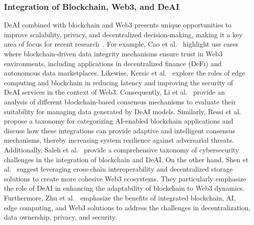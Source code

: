 \documentclass[5p,twocolumn]{elsarticle}
\begin{document}
\subsubsection{Integration of Blockchain, Web3, and DeAI}
DeAI combined with blockchain and Web3 presents unique opportunities to improve scalability, privacy, and decentralized decision-making, making it a key area of focus for recent research~\cite{cao2022decentralized,kersic2024review,li2024blockchain,ressi2024ai,saleh2024blockchain,shen2024artificial,zhu2024survey}. For example, Cao et al.~\cite{cao2022decentralized} highlight use cases where blockchain-driven data integrity mechanisms ensure trust in Web3 environments, including applications in decentralized finance (DeFi) and autonomous data marketplaces. Likewise, Kersic et al.~\cite{kersic2024review} explore the roles of edge computing and blockchain in reducing latency and improving the security of DeAI services in the context of Web3. Consequently, Li et al.~\cite{li2024blockchain} provide an analysis of different blockchain-based consensus mechanisms to evaluate their suitability for managing data generated by DeAI models. Similarly, Ressi et al.~\cite{ressi2024ai} propose a taxonomy for categorizing AI-enabled blockchain applications and discuss how these integrations can provide adaptive and intelligent consensus mechanisms, thereby increasing system resilience against adversarial threats. Additionally, Saleh et al.~\cite{saleh2024blockchain} provide a comprehensive taxonomy of cybersecurity challenges in the integration of blockchain and DeAI. On the other hand, Shen et al.~\cite{shen2024artificial} suggest leveraging cross-chain interoperability and decentralized storage solutions to create more cohesive Web3 ecosystems. They particularly emphasize the role of DeAI in enhancing the adaptability of blockchain to Web3 dynamics. Furthermore, Zhu et al.~\cite{zhu2024survey} emphasize the benefits of integrated blockchain, AI, edge computing, and Web3 solutions to address the challenges in decentralization, data ownership, privacy, and security.
\end{document}
